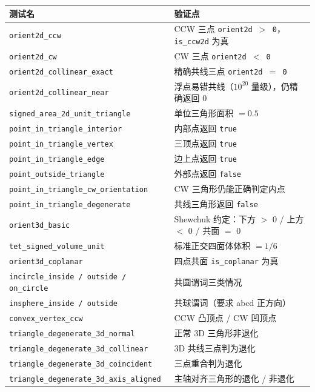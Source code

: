 \documentclass[11pt,a4paper]{article}
\begin{document}
\begin{center}
\renewcommand{\arraystretch}{1.18}
\begin{tabular}{@{}ll@{}}
  \toprule
  \textbf{测试名} & \textbf{验证点} \\
  \midrule
  \texttt{orient2d\_ccw}                       & CCW 三点 \texttt{orient2d $>$ 0}，\texttt{is\_ccw2d} 为真 \\
  \texttt{orient2d\_cw}                        & CW 三点 \texttt{orient2d $<$ 0} \\
  \texttt{orient2d\_collinear\_exact}          & 精确共线三点 \texttt{orient2d $=$ 0} \\
  \texttt{orient2d\_collinear\_near}           & 浮点易错共线（$10^{20}$ 量级），仍精确返回 0 \\
  \texttt{signed\_area\_2d\_unit\_triangle}    & 单位三角形面积 $= 0.5$ \\
  \texttt{point\_in\_triangle\_interior}       & 内部点返回 \texttt{true} \\
  \texttt{point\_in\_triangle\_vertex}         & 三顶点返回 \texttt{true} \\
  \texttt{point\_in\_triangle\_edge}           & 边上点返回 \texttt{true} \\
  \texttt{point\_outside\_triangle}            & 外部点返回 \texttt{false} \\
  \texttt{point\_in\_triangle\_cw\_orientation}& CW 三角形仍能正确判定内点 \\
  \texttt{point\_in\_triangle\_degenerate}     & 共线三角形返回 \texttt{false} \\
  \texttt{orient3d\_basic}                     & Shewchuk 约定：下方 $>$ 0 / 上方 $<$ 0 / 共面 $=$ 0 \\
  \texttt{tet\_signed\_volume\_unit}           & 标准正交四面体体积 $= 1/6$ \\
  \texttt{orient3d\_coplanar}                  & 四点共面 \texttt{is\_coplanar} 为真 \\
  \texttt{incircle\_inside / outside / on\_circle} & 共圆谓词三类情况 \\
  \texttt{insphere\_inside / outside}          & 共球谓词（要求 abcd 正方向） \\
  \texttt{convex\_vertex\_ccw}                 & CCW 凸顶点 / CW 凹顶点 \\
  \texttt{triangle\_degenerate\_3d\_normal}    & 正常 3D 三角形非退化 \\
  \texttt{triangle\_degenerate\_3d\_collinear} & 3D 共线三点判为退化 \\
  \texttt{triangle\_degenerate\_3d\_coincident}& 三点重合判为退化 \\
  \texttt{triangle\_degenerate\_3d\_axis\_aligned} & 主轴对齐三角形的退化 / 非退化 \\
  \bottomrule
\end{tabular}
\end{center}
\end{document}
